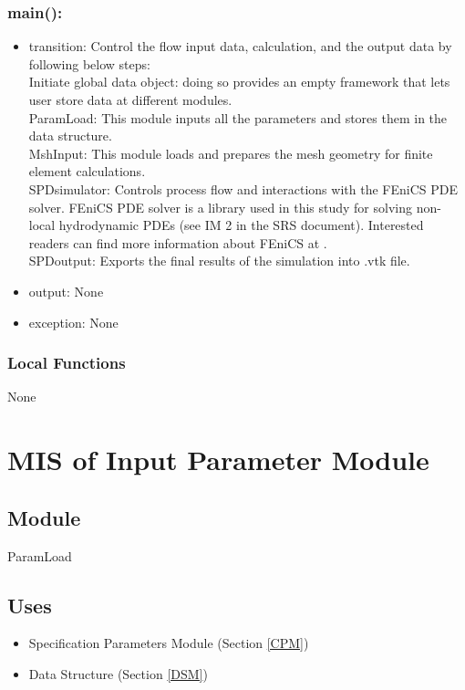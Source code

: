 \documentclass[12pt, titlepage]{article}
\begin{document}
\subsubsection*{main():}
\begin{itemize}
\item transition: Control the flow input data, calculation, and the output data by following below steps:\\

\subitem Initiate global data object: doing so provides an empty framework that lets user store data at different modules. \\ 
\subitem ParamLoad: This module inputs all the parameters and stores them in the data structure.\\

\subitem MshInput: This module loads and prepares the mesh geometry for finite element calculations.\\ 

\subitem SPDsimulator: Controls process flow and interactions with the FEniCS PDE solver. FEniCS PDE solver is a library used in this study for solving non-local hydrodynamic PDEs (see IM 2 in the SRS document). Interested readers can find more information about FEniCS at \cite{alnaes2015fenics,logg2012finite}.\\

\subitem SPDoutput: Exports the final results of the simulation into .vtk file. 

\item output: None
\item exception: None
\end{itemize}


\subsubsection{Local Functions}

None

\newpage
%
%
%
%
%
\section{MIS of Input Parameter Module} \label{IPM}  
	
\subsection{Module}
ParamLoad

\subsection{Uses}
\begin{itemize}
	\item Specification Parameters Module (Section \ref{CPM})
	\item Data Structure (Section \ref{DSM})

\end{itemize}
\end{document}
